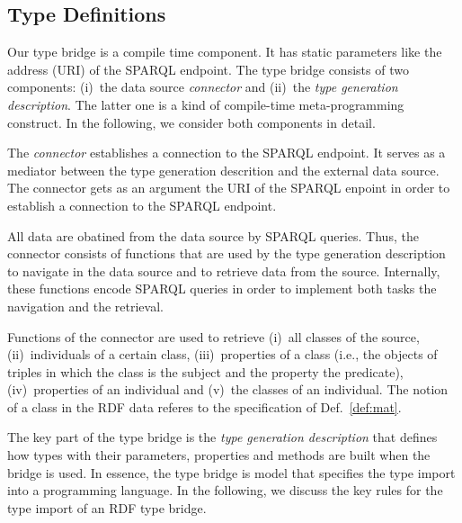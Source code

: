 \documentclass{llncs} %
\newcommand{\ggr}[1]{\textcolor{magenta}{comment Gerd: \textit{#1}}}
\begin{document}
\subsection{Type Definitions}

Our type bridge is a compile time component. It has static parameters like
the address (URI) of the SPARQL endpoint.
The type bridge consists of two components: (i)~the data source \emph{connector} and (ii)~the
\emph{type generation description}. The latter one is a kind of compile-time meta-programming construct.
In the following, we consider both components in detail.

The \emph{connector} establishes a connection to the SPARQL endpoint. It serves as a mediator
between the type generation descrition and the external data source.
The connector gets as an argument the URI of the SPARQL enpoint
in order to establish a connection to the SPARQL endpoint.

All data are obatined from the data source by SPARQL queries.
Thus, the connector consists of functions that are used by the type generation description
to navigate in the data source and to retrieve data from the source.
Internally, these functions encode SPARQL queries in order to implement both tasks the navigation and the retrieval.

Functions of the connector are used to retrieve (i)~all classes of the source,
(ii)~individuals of a certain class, (iii)~properties of a class (i.e., the objects of
triples in which the class is the subject and the property the predicate),
(iv)~properties of an individual and (v)~the classes of an individual.
The notion of a class in the RDF data referes to the specification of Def.~\ref{def:mat}.
%
%
%



The key part of the type bridge is the \emph{type generation description} that
defines how types with their parameters, properties and methods are built when the bridge is used.
In essence, the type bridge is model that specifies the type import into a programming language.
In the following, we discuss the key rules for the type import of an RDF type bridge.
\end{document}
